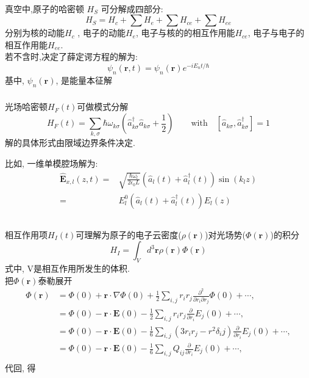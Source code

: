 \begin{frame} 
\frametitle{}
    ~\\
      {\Bullet}真空中,原子的哈密顿 $H_S$ 可分解成四部分:
     \[ H_S = H_c + \sum H_e + \sum H_{ce} + \sum H_{ee}\]
     分别为核的动能$H_c$ , 电子的动能$H_e$, 电子与核的的相互作用能$H_{ce}$, 电子与电子的相互作用能$H_{ee}$. \\ {\vspace*{0.3em}}
     若不含时,决定了薛定谔方程的解为:
      \[ \psi_n(\mathbf{r},t)= \psi_n(\mathbf{r})e ^{-i E_n t/\hbar} \]
    基中, $\psi_n(\mathbf{r})$, 是能量本征解
\end{frame}

\begin{frame} 
 \frametitle{}
 {\Bullet} 光场哈密顿$H_F(t)$可做模式分解
 \[ H_F(t)= \sum_{k,\sigma}\hbar \omega_{k\sigma} \left(\hat{a}^\dagger _{k\sigma} \hat{a} _{k\sigma}+ \frac{1 }{2}\right) \qquad \text{with} \quad [\hat{a} _{k\sigma},\hat{a}^\dagger _{k\sigma}]=1 \]
 解的具体形式由限域边界条件决定. \\ {\vspace*{2.3em}}
 
 比如, 一维单模腔场解为:
 \[\begin{aligned}
   \hat{\mathbf{E}}_{x,l}( z,t) =& \sqrt{\frac{\hbar\omega_l}{ 2\epsilon_0 L }} (\hat{a}_l(t)+ \hat{a}_l ^\dagger(t)) \sin(k_l z) \\ =&E^0 _l (\hat{a}_l(t)+ \hat{a}_l ^\dagger(t)) E_l(z)\\
   \end{aligned} 
   \]
\end{frame}

\begin{frame} 
\frametitle{}
{\Bullet} 相互作用项$H_I(t)$可理解为原子的电子云密度($\rho(\mathbf{r})$)对光场势($\Phi(\mathbf{r})$)的积分
    \[ H_I = \int_V d^3 \mathbf{r} \rho(\mathbf{r}) \Phi(\mathbf{r})\]
    式中, V是相互作用所发生的体积.\\ {\vspace*{0.3em}} 
    把$\Phi(\mathbf{r})$泰勒展开
    \[\begin{aligned}
        \Phi(\mathbf{r}) &= \Phi(0) + \mathbf{r}\cdot \nabla \Phi(0) + \frac{1}{2} \sum_{i,j} r_i r_j \frac{\partial^2 }{\partial r_i \partial r_j }\Phi(0) + \cdots , \\ 
        &= \Phi(0) - \mathbf{r}\cdot \mathbf{E}(0) - \frac{1}{2} \sum_{i,j} r_i r_j \frac{\partial }{\partial r_i }E_j(0) + \cdots , \\ 
        &= \Phi(0) - \mathbf{r}\cdot \mathbf{E}(0) - \frac{1}{6} \sum_{i,j} (3r_i r_j-r^2\delta_ij) \frac{\partial }{\partial r_i }E_j(0) + \cdots , \\ 
        &= \Phi(0) - \mathbf{r}\cdot \mathbf{E}(0) - \frac{1}{6} \sum_{i,j} Q_{ij}\frac{\partial }{\partial r_i }E_j(0) + \cdots , \\ 
    \end{aligned} \]
    代回, 得
\end{frame}

